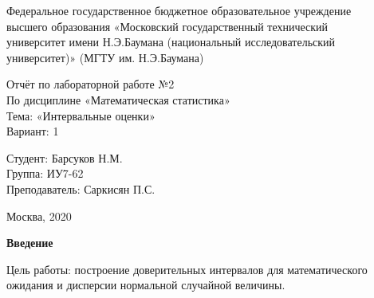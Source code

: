 \documentclass[12pt,a4paper]{scrartcl}
\begin{document}
\begin{titlepage}
\newpage
\begin{center}
Федеральное государственное бюджетное образовательное учреждение  \\
\vspace{0.25cm}%
высшего образования «Московский государственный технический  \\
\vspace{0.25cm}%
университет имени Н.Э.Баумана (национальный исследовательский \\
\vspace{0.25cm}%
университет)» (МГТУ им. Н.Э.Баумана) \\
\end{center}
\vspace{5cm}
\begin{center}
\Large Отчёт по лабораторной работе №2 \\ По дисциплине «Математическая статистика» \\ Тема: «Интервальные оценки» \\ Вариант: 1
\end{center}
\vspace{6em}
\begin{flushright}
Студент: \hrulefill Барсуков Н.М. \\
\vspace{1.5em}
Группа: \hrulefill ИУ7-62\\
\vspace{1.5em}
Преподаватель: \hrulefill Саркисян П.С.\\
\vspace{1.5em}
\end{flushright}
\vspace{\fill}
\begin{center}
Москва, 2020
\end{center}
\end{titlepage}
\newpage
\tableofcontents
{}
\newpage
\begin{center}
\textbf {Введение}
\end{center}

Цель работы: построение доверительных интервалов для математического ожидания и дисперсии нормальной случайной величины.
\end{document}
